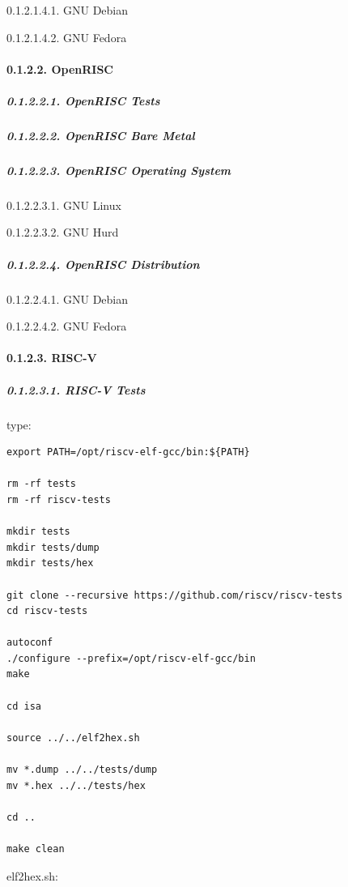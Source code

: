 \documentclass[
]{article}
\begin{document}
0.1.2.1.4.1. GNU Debian

0.1.2.1.4.2. GNU Fedora

\hypertarget{openrisc}{%
\paragraph{0.1.2.2. OpenRISC}\label{openrisc}}

\hypertarget{openrisc-tests}{%
\subparagraph{0.1.2.2.1. OpenRISC Tests}\label{openrisc-tests}}

\hypertarget{openrisc-bare-metal}{%
\subparagraph{0.1.2.2.2. OpenRISC Bare
Metal}\label{openrisc-bare-metal}}

\hypertarget{openrisc-operating-system}{%
\subparagraph{0.1.2.2.3. OpenRISC Operating
System}\label{openrisc-operating-system}}

0.1.2.2.3.1. GNU Linux

0.1.2.2.3.2. GNU Hurd

\hypertarget{openrisc-distribution}{%
\subparagraph{0.1.2.2.4. OpenRISC
Distribution}\label{openrisc-distribution}}

0.1.2.2.4.1. GNU Debian

0.1.2.2.4.2. GNU Fedora

\hypertarget{risc-v}{%
\paragraph{0.1.2.3. RISC-V}\label{risc-v}}

\hypertarget{risc-v-tests}{%
\subparagraph{0.1.2.3.1. RISC-V Tests}\label{risc-v-tests}}

type:

\begin{verbatim}
export PATH=/opt/riscv-elf-gcc/bin:${PATH}

rm -rf tests
rm -rf riscv-tests

mkdir tests
mkdir tests/dump
mkdir tests/hex

git clone --recursive https://github.com/riscv/riscv-tests
cd riscv-tests

autoconf
./configure --prefix=/opt/riscv-elf-gcc/bin
make

cd isa

source ../../elf2hex.sh

mv *.dump ../../tests/dump
mv *.hex ../../tests/hex

cd ..

make clean
\end{verbatim}

elf2hex.sh:
\end{document}
